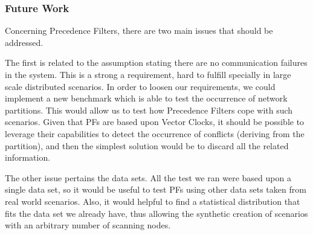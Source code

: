 \subsubsection{Future Work}
\label{sec:future-work}

Concerning Precedence Filters, there are two main issues that should be
addressed.

The first is related to the assumption stating there are
no communication failures in the system. This is a strong a requirement,
hard to fulfill specially in large scale distributed scenarios.  In
order to loosen our requirements, we could implement a new benchmark which is
able to test the occurrence of network partitions.  This would allow
us to test how Precedence Filters cope with such scenarios. Given that
PFs are based upon Vector Clocks, it should be possible to leverage
their capabilities to detect the occurrence of conflicts (deriving
from the partition), and then the simplest solution would be to discard
all the related information.

The other issue pertains the data sets. All the test we
ran were based upon a single data set, so it would be useful to test
PFs using other data sets taken from real world scenarios. Also, it would
helpful to find a statistical distribution that fits the data set we
already have, thus allowing the synthetic creation of scenarios with
an arbitrary number of scanning nodes.


